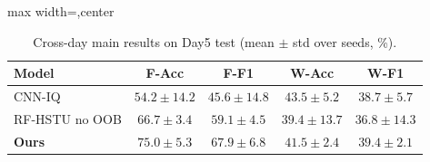 \begin{table}[!t]
\centering
\caption{Cross-day main results on Day5 test (mean $\pm$ std over seeds, \%).}
\label{tab:cross_day_main}
\footnotesize
\setlength{\tabcolsep}{2.6pt}
\renewcommand{\arraystretch}{1.05}
\begin{adjustbox}{max width=\columnwidth,center}
\begin{tabular}{@{}lcccc@{}}
\toprule
Model & F-Acc & F-F1 & W-Acc & W-F1 \\
\midrule
CNN-IQ & $54.2{\pm}14.2$ & $45.6{\pm}14.8$ & $43.5{\pm}5.2$ & $38.7{\pm}5.7$ \\
RF-HSTU no OOB & $66.7{\pm}3.4$ & $59.1{\pm}4.5$ & $39.4{\pm}13.7$ & $36.8{\pm}14.3$ \\
\textbf{Ours} & $\mathbf{75.0{\pm}5.3}$ & $\mathbf{67.9{\pm}6.8}$ & $41.5{\pm}2.4$ & $39.4{\pm}2.1$ \\
\bottomrule
\end{tabular}
\end{adjustbox}
\end{table}
